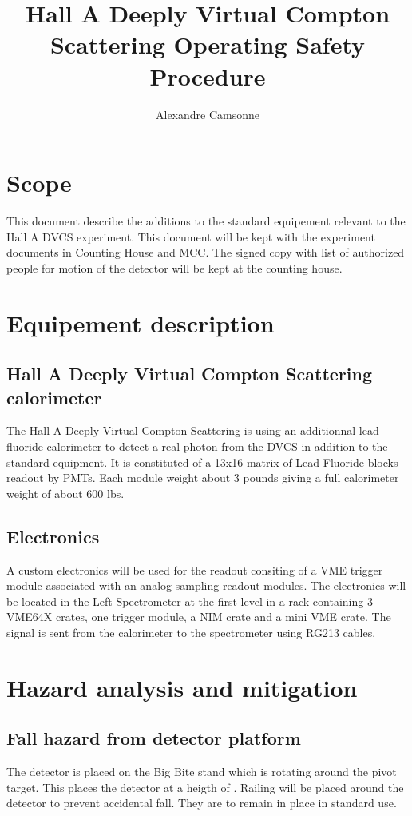 \documentclass{article}
\title {Hall A Deeply Virtual Compton Scattering Operating Safety Procedure}
\author {Alexandre Camsonne}
\begin{document}
\maketitle
\section{Scope}
This document describe the additions to the standard equipement relevant to the Hall A DVCS experiment. This document will be kept with the experiment documents in Counting House and MCC. The signed copy with list of authorized people for motion of the detector will be kept at the counting house.
\section{Equipement description}
\subsection{Hall A Deeply Virtual Compton Scattering calorimeter}
The Hall A Deeply Virtual Compton Scattering is using an additionnal lead fluoride calorimeter to detect a real photon from the DVCS in addition to the standard equipment. It is constituted of a 13x16 matrix of Lead Fluoride blocks readout by PMTs. Each module weight about 3 pounds giving a full calorimeter weight of about 600 lbs.
\subsection{Electronics}
 A custom electronics will be used for the readout consiting of a VME trigger module associated with an analog sampling readout modules. The electronics will be located in the Left Spectrometer at the first level in a rack containing 3 VME64X crates, one trigger module, a NIM crate and a mini VME crate.
The signal is sent from the calorimeter to the spectrometer using RG213 cables.
\section{Hazard analysis and mitigation}
\subsection{Fall hazard from detector platform}
The detector is placed on the Big Bite stand which is rotating around the pivot target. This places the detector at a heigth of . Railing will be placed around the detector to prevent accidental fall. They are to remain in place in standard use. 
\end{document}
